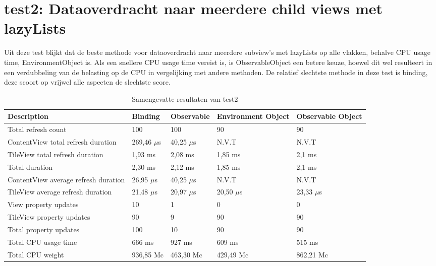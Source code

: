 \section{test2: Dataoverdracht naar meerdere child views met lazyLists}
Uit deze test blijkt dat de beste methode voor dataoverdracht naar meerdere subview's met lazyLists op alle vlakken, behalve CPU usage time, EnvironmentObject is. Als een snellere CPU usage time vereist is, is ObservableObject een betere keuze, hoewel dit wel resulteert in een verdubbeling van de belasting op de CPU in vergelijking met andere methoden. De relatief slechtste methode in deze test is binding, deze scoort op vrijwel alle aspecten de slechtste score.  
\begin{table}[h!]
    \centering
     \begin{tabularx}{\textwidth}{|>{\raggedright\arraybackslash}m{5cm}|X|X|X|X|}
        \hline
        \textbf{Description} & \textbf{Binding} & \textbf{Observable} & \textbf{Environment Object} & \textbf{Observable Object} \\ 
        \hline
        Total refresh count & \cellcolor{red!50}100 & \cellcolor{red!50}100 & \cellcolor{green!50}90 & \cellcolor{green!50}90 \\ 
        \hline
        ContentView total refresh duration & 269,46 \(\mu\)s & 40,25 \(\mu\)s & N.V.T & N.V.T \\ 
        \hline
        TileView total refresh duration & 1,93 ms & 2,08 ms & 1,85 ms & 2,1 ms \\ 
        \hline
        Total duration & \cellcolor{red!50}2,30 ms & 2,12 ms & \cellcolor{green!50}1,85 ms & 2,1 ms \\ 
        \hline
        ContentView average refresh duration & 26,95 \(\mu\)s & 40,25 \(\mu\)s & N.V.T & N.V.T \\ 
        \hline
        TileView average refresh duration & 21,48 \(\mu\)s & 20,97 \(\mu\)s & 20,50 \(\mu\)s & 23,33 \(\mu\)s \\ 
        \hline
        View property updates & 10 & 1 & 0 & 0 \\ 
        \hline
        TileView property updates & 90 & 9 & 90 & 90 \\ 
        \hline
        Total property updates & \cellcolor{red!50}100 & \cellcolor{green!50}10 & 90 & 90 \\ 
        \hline
        Total CPU usage time & 666 ms & \cellcolor{red!50}927 ms & 609 ms & \cellcolor{green!50}515 ms \\ 
        \hline
        Total CPU weight & \cellcolor{red!50}936,85 Mc & 463,30 Mc & \cellcolor{green!50}429,49 Mc & 862,21 Mc \\ 
        \hline
    \end{tabularx}
    \caption{Samengevatte resultaten van test2}
    \label{table:summary2}
\end{table}

